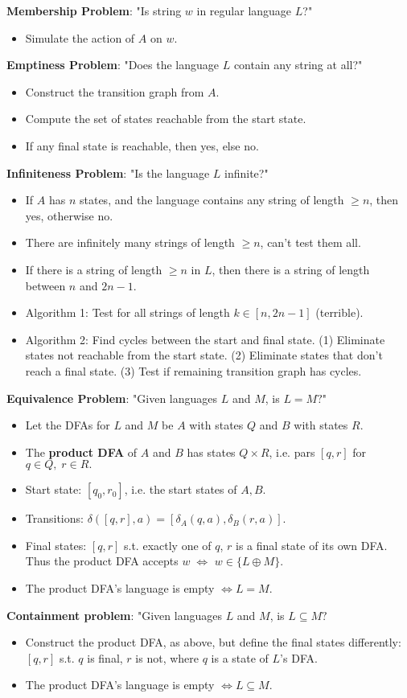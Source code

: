 \textbf{Membership Problem}: "Is string $w$ in regular language $L$?"
\begin{itemize}
    \item Simulate the action of $A$ on $w$.
\end{itemize}
\textbf{Emptiness Problem}: "Does the language $L$ contain any string at all?"
\begin{itemize}
    \item Construct the transition graph from $A.$
    \item Compute the set of states reachable from the start state. 
    \item If any final state is reachable, then yes, else no.
\end{itemize}
\textbf{Infiniteness Problem}: "Is the language $L$ infinite?"
\begin{itemize}
    \item If $A$ has $n$ states, and the language contains any string of length $\geq n$, then yes, otherwise no.
    \item There are infinitely many strings of length $\geq n$, can't test them all.
    \item If there is a string of length $\geq n$ in $L$, then there is a string of length between $n$ and $2n -1.$
    \item Algorithm 1: Test for all strings of length $k \in [n, 2n-1]$ (terrible).
    \item Algorithm 2: Find cycles between the start and final state. (1) Eliminate states not reachable from the start state. (2) Eliminate states that don't reach a final state. (3) Test if remaining transition graph has cycles.
\end{itemize}
\textbf{Equivalence Problem}: "Given languages $L$ and $M$, is $L = M?$" 
\begin{itemize}
    \item Let the DFAs for $L$ and $M$ be $A$ with states $Q$ and $B$ with states $R$.
    \item The \textbf{product DFA} of $A$ and $B$ has states $Q\times R$, i.e. pars $[q,r]$ for $q \in Q, \; r \in R.$
    \item Start state: $[q_0 , r_0]$, i.e. the start states of $A, B$.
    \item Transitions: $\delta ([q,r], a) = [\delta_A(q, a), \delta_B (r, a)]$.
     \item Final states: $[q,r]$ s.t. exactly one of $q$, $r$ is a final state of its own DFA. Thus the product DFA accepts $w \; \iff$ $w\in \{L \oplus M\}$.
     \item The product DFA's language is empty $\iff L=M$.
\end{itemize}
\textbf{Containment problem}: "Given languages $L$ and $M$, is $L\subseteq M?$
\begin{itemize}
    \item Construct the product DFA, as above, but define the final states differently: $[q,r]$ s.t. $q$ is final, $r$ is not, where $q$ is a state of $L$'s DFA.
    \item The product DFA's language is empty $\iff L\subseteq M$.
\end{itemize}
